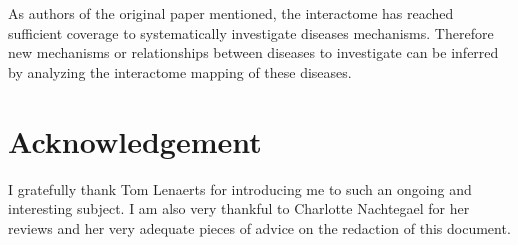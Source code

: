 \documentclass[letterpaper]{article}
\begin{document}
As authors of the original paper mentioned, the interactome has reached sufficient coverage to
systematically investigate diseases mechanisms. Therefore new mechanisms or relationships between
diseases to investigate can be inferred by analyzing the interactome mapping of these diseases.

\section*{Acknowledgement}
I gratefully thank Tom Lenaerts for introducing me to such an ongoing and interesting subject.
I am also very thankful to Charlotte Nachtegael for her reviews and her very adequate pieces
of advice on the redaction of this document.

\footnotesize

{}
\end{document}
